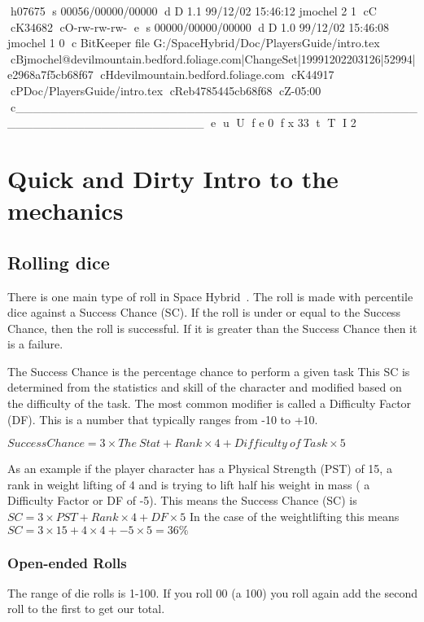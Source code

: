 h07675
s 00056/00000/00000
d D 1.1 99/12/02 15:46:12 jmochel 2 1
cC
cK34682
cO-rw-rw-rw-
e
s 00000/00000/00000
d D 1.0 99/12/02 15:46:08 jmochel 1 0
c BitKeeper file G:/SpaceHybrid/Doc/PlayersGuide/intro.tex
cBjmochel@devilmountain.bedford.foliage.com|ChangeSet|19991202203126|52994|e2968a7f5cb68f67
cHdevilmountain.bedford.foliage.com
cK44917
cPDoc/PlayersGuide/intro.tex
cReb4785445cb68f68
cZ-05:00
c______________________________________________________________________
e
u
U
f e 0
f x 33
t
T
I 2
\chapter{Quick and Dirty Intro to the mechanics}

\section{Rolling dice}

There is one main type of roll in Space Hybrid\ . The roll is 
made with percentile dice against a Success Chance (SC). If the roll 
is under or equal to the Success Chance, then the roll is successful.
If it is greater than the Success Chance then it is a failure.

The Success Chance is the percentage chance to perform a given task This SC is
determined from the statistics and skill of the character 
and modified based on the difficulty of the task. The most common 
modifier is called a Difficulty Factor (DF). This is a number that typically 
ranges from -10 to +10.

$ {Success Chance} = 3 \times {The\ Stat} + Rank \times 4 + {Difficulty\ of\ Task} \times 5 $

As an example if the player character has a Physical Strength (PST) of 15, a rank in 
weight lifting of 4 and is trying to lift half his weight in mass ( a Difficulty Factor or DF of -5). 
This means the Success Chance (SC) is $ SC = 3 \times PST + Rank \times 4 + DF \times 5 $
In the case of the weightlifting this means $ SC = 3 \times 15 + 4 \times 4 + -5 \times 5  = 36\% $

\subsection{Open-ended Rolls}

The range of die rolls is 1-100. If you roll 00 (a 100) you roll again add
the second roll to the first to get our total.

